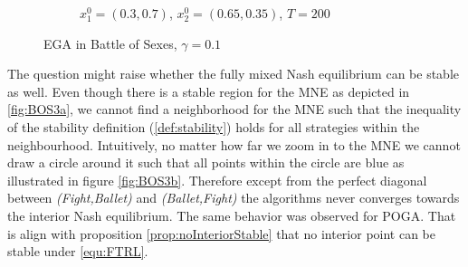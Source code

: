 \begin{figure}[H]
\begin{subfigure}{.5\textwidth}
    \caption{$x_{1}^0 = (0.3,0.7)$, $x_{2}^0 = (0.65,0.35)$, $T = 200$}
    \label{fig:BOS2b}
\end{subfigure}
\caption{EGA in Battle of Sexes, $\gamma = 0.1$}
\label{fig:BOS2}
\end{figure}

The question might raise whether the fully mixed Nash equilibrium can be stable as well. Even though there is a stable region for the MNE as depicted in \ref{fig:BOS3a}, we cannot find a neighborhood for the MNE such that the inequality of the stability definition (\ref{def:stability}) holds for all strategies within the neighbourhood. Intuitively, no matter how far we zoom in to the MNE we cannot draw a circle around it such that all points within the circle are blue as illustrated in figure \ref{fig:BOS3b}. Therefore except from the perfect diagonal between \textit{(Fight,Ballet)} and \textit{(Ballet,Fight)} the algorithms never converges towards the interior Nash equilibrium. The same behavior was observed for POGA. That is align with proposition \ref{prop:noInteriorStable} that no interior point can be stable under \ref{equ:FTRL}. 

